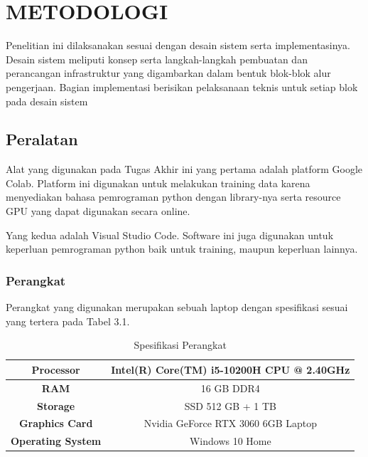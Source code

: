 \chapter{METODOLOGI}
\label{chap:metodologi}


\usetikzlibrary{positioning, fit, calc}   

Penelitian ini dilaksanakan sesuai dengan desain sistem serta implementasinya. Desain sistem meliputi konsep serta langkah-langkah pembuatan dan perancangan infrastruktur yang digambarkan dalam bentuk blok-blok alur pengerjaan. Bagian implementasi berisikan pelaksanaan teknis untuk setiap blok pada desain sistem


\section{Peralatan}
\label{sec:peralatan}

Alat yang digunakan pada Tugas Akhir ini yang pertama adalah platform Google Colab. Platform ini digunakan untuk melakukan training data karena menyediakan bahasa pemrograman python dengan library-nya serta resource GPU yang dapat digunakan secara online.

Yang kedua adalah Visual Studio Code. Software ini juga digunakan untuk keperluan pemrograman python baik untuk training, maupun keperluan lainnya.

\subsection{Perangkat}
\label{subsec:perangkat}

	Perangkat yang digunakan merupakan sebuah laptop dengan spesifikasi sesuai yang tertera pada Tabel 3.1.
	
	\begin{table}[h]
		\centering
		
		\caption{Spesifikasi Perangkat}
		
		\begin{tabular}{|c|c|}
			\hline
			\textbf{Processor}        & Intel(R) Core(TM) i5-10200H CPU @ 2.40GHz \\ \hline
			\textbf{RAM}              & 16 GB DDR4                                \\ \hline
			\textbf{Storage}          & SSD 512 GB + 1 TB                         \\ \hline
			\textbf{Graphics Card}    & Nvidia GeForce RTX 3060 6GB Laptop        \\ \hline
			\textbf{Operating System} & Windows 10 Home                           \\ \hline
		\end{tabular}
	
		\label{fig:perangkat}
	\end{table}

